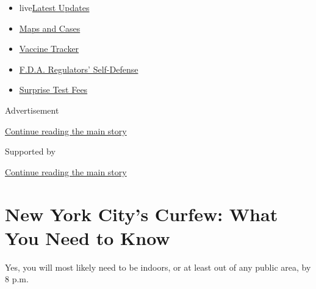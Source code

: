 \begin{itemize}
\tightlist
\item
  live\href{https://www.nytimes3xbfgragh.onion/2020/09/11/world/covid-19-coronavirus.html?name=styln-coronavirus-national\&region=TOP_BANNER\&block=storyline_menu_recirc\&action=click\&pgtype=Article\&impression_id=d7f3d5f0-f4b9-11ea-9a28-53af4ab06a19\&variant=undefined}{Latest
  Updates}
\item
  \href{https://www.nytimes3xbfgragh.onion/interactive/2020/us/coronavirus-us-cases.html?name=styln-coronavirus-national\&region=TOP_BANNER\&block=storyline_menu_recirc\&action=click\&pgtype=Article\&impression_id=d7f3d5f1-f4b9-11ea-9a28-53af4ab06a19\&variant=undefined}{Maps
  and Cases}
\item
  \href{https://www.nytimes3xbfgragh.onion/interactive/2020/science/coronavirus-vaccine-tracker.html?name=styln-coronavirus-national\&region=TOP_BANNER\&block=storyline_menu_recirc\&action=click\&pgtype=Article\&impression_id=d7f3d5f2-f4b9-11ea-9a28-53af4ab06a19\&variant=undefined}{Vaccine
  Tracker}
\item
  \href{https://www.nytimes3xbfgragh.onion/2020/09/10/us/politics/fda-coronavirus-vaccine.html?name=styln-coronavirus-national\&region=TOP_BANNER\&block=storyline_menu_recirc\&action=click\&pgtype=Article\&impression_id=d7f3d5f3-f4b9-11ea-9a28-53af4ab06a19\&variant=undefined}{F.D.A.
  Regulators' Self-Defense}
\item
  \href{https://www.nytimes3xbfgragh.onion/2020/09/09/upshot/coronavirus-surprise-test-fees.html?name=styln-coronavirus-national\&region=TOP_BANNER\&block=storyline_menu_recirc\&action=click\&pgtype=Article\&impression_id=d7f3d5f4-f4b9-11ea-9a28-53af4ab06a19\&variant=undefined}{Surprise
  Test Fees}
\end{itemize}

Advertisement

\protect\hyperlink{after-top}{Continue reading the main story}

Supported by

\protect\hyperlink{after-sponsor}{Continue reading the main story}

\hypertarget{new-york-citys-curfew-what-you-need-to-know}{%
\section{New York City's Curfew: What You Need to
Know}\label{new-york-citys-curfew-what-you-need-to-know}}

Yes, you will most likely need to be indoors, or at least out of any
public area, by 8 p.m.

